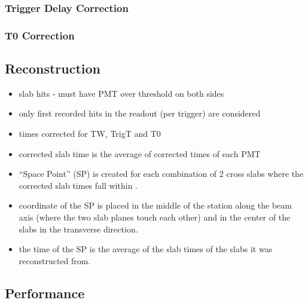\subsubsection{Trigger Delay Correction}


\subsubsection{T0 Correction}





\subsection{Reconstruction}

\begin{itemize}
\item slab hits - must have PMT over threshold on both sides
\item only first recorded hits in the readout (per trigger) are considered
\item times corrected for TW, TrigT and T0
\item corrected slab time is the average of corrected times of each PMT
\item ``Space Point'' (SP) is created for each combination of 2 cross
  slabs where the corrected slab times fall within .
\item coordinate of the SP is placed in the middle of the station
  along the beam axis (where the two slab planes touch each other) and
  in the center of the slabs in the transverse direction.
\item the time of the SP is the average of the slab times of the slabs
  it was reconstructed from.
\end{itemize}




\subsection{Performance}
\label{SubSect:TOF_Performance}


